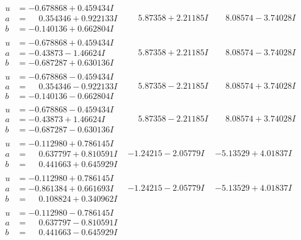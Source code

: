\documentclass[1p]{elsarticle_modified}
\theoremstyle{definition}
\begin{document}
$$\begin{array}{c|c|c}
\begin{aligned}
u &= -0.678868 + 0.459434 I \\
a &= \phantom{-}0.354346 + 0.922133 I \\
b &= -0.140136 + 0.662804 I\end{aligned}
 & \phantom{-}5.87358 + 2.21185 I & \phantom{-}8.08574 - 3.74028 I \\ \hline\begin{aligned}
u &= -0.678868 + 0.459434 I \\
a &= -0.43873 - 1.46624 I \\
b &= -0.687287 + 0.630136 I\end{aligned}
 & \phantom{-}5.87358 + 2.21185 I & \phantom{-}8.08574 - 3.74028 I \\ \hline\begin{aligned}
u &= -0.678868 - 0.459434 I \\
a &= \phantom{-}0.354346 - 0.922133 I \\
b &= -0.140136 - 0.662804 I\end{aligned}
 & \phantom{-}5.87358 - 2.21185 I & \phantom{-}8.08574 + 3.74028 I \\ \hline\begin{aligned}
u &= -0.678868 - 0.459434 I \\
a &= -0.43873 + 1.46624 I \\
b &= -0.687287 - 0.630136 I\end{aligned}
 & \phantom{-}5.87358 - 2.21185 I & \phantom{-}8.08574 + 3.74028 I \\ \hline\begin{aligned}
u &= -0.112980 + 0.786145 I \\
a &= \phantom{-}0.637797 + 0.810591 I \\
b &= \phantom{-}0.441663 + 0.645929 I\end{aligned}
 & -1.24215 - 2.05779 I & -5.13529 + 4.01837 I \\ \hline\begin{aligned}
u &= -0.112980 + 0.786145 I \\
a &= -0.861384 + 0.661693 I \\
b &= \phantom{-}0.108824 + 0.340962 I\end{aligned}
 & -1.24215 - 2.05779 I & -5.13529 + 4.01837 I \\ \hline\begin{aligned}
u &= -0.112980 - 0.786145 I \\
a &= \phantom{-}0.637797 - 0.810591 I \\
b &= \phantom{-}0.441663 - 0.645929 I\end{aligned}

\end{array}$$
\end{document}
